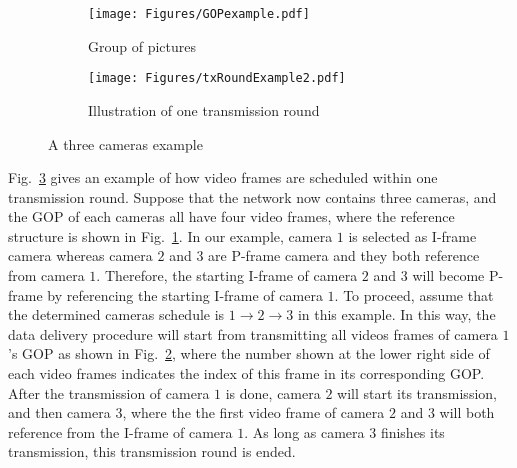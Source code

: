 {%
\begin{figure}
\begin{center}
\begin{subfigure}[b]{0.65\columnwidth}
\texttt{[image: Figures/GOPexample.pdf]}
\caption{\label{fig::txRoundExampleGOP}Group of pictures}
\end{subfigure}
\begin{subfigure}[b]{0.95\columnwidth}
\texttt{[image: Figures/txRoundExample2.pdf]}
\caption{\label{fig::txRoundExampleTx}Illustration of one transmission round}
\end{subfigure}
\caption{\label{fig::txRoundExample}A three cameras example}
\end{center}
\end{figure}
%
Fig.~\ref{fig::txRoundExample} gives an example of how video frames are scheduled within one transmission round.
Suppose that the network now contains three cameras, and the GOP of each cameras all have four video frames, where the reference structure is shown in Fig.~\ref{fig::txRoundExampleGOP}.
In our example, camera $1$ is selected as I-frame camera whereas camera $2$ and $3$ are P-frame camera and they both reference from camera $1$.
Therefore, the starting I-frame of camera $2$ and $3$ will become P-frame by referencing the starting I-frame of camera $1$.
To proceed, assume that the determined cameras schedule is $1 \rightarrow 2 \rightarrow 3$ in this example.
In this way, the data delivery procedure will start from transmitting all videos frames of camera $1$'s GOP as shown in Fig.~\ref{fig::txRoundExampleTx}, where the number shown at the lower right side of each video frames indicates the index of this frame in its corresponding GOP.
After the transmission of camera $1$ is done, camera $2$ will start its transmission, and then camera $3$, where the the first video frame of camera $2$ and $3$ will both reference from the I-frame of camera $1$.
As long as camera $3$ finishes its transmission, this transmission round is ended.
%
}
